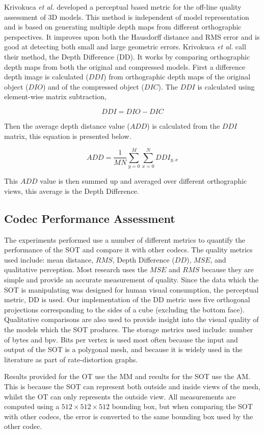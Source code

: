 Krivokuca \textit{et al.} \cite{Krivokuca12New} developed a perceptual based metric for the off-line quality assessment of 3D models. This method is independent of model representation and is based on generating multiple depth maps from different orthographic perspectives. It improves upon both the Hausdorff distance and RMS error and is good at detecting both small and large geometric errors. Krivokuca \textit{et al.} call their method, the Depth Difference (DD). It works by comparing orthographic depth maps from both the original and compressed models. First a difference depth image is calculated ($DDI$) from orthographic depth maps of the original object ($DIO$) and of the compressed object ($DIC$). The $DDI$ is calculated using element-wise matrix subtraction,

$$
DDI = DIO - DIC
$$

Then the average depth distance value ($ADD$) is calculated from the $DDI$ matrix, this equation is presented below.

$$
ADD = \frac{1}{MN} \sum_{y=0}^{M} \sum_{x=0}^{N} DDI_{y,x}
$$

This $ADD$ value is then summed up and averaged over different orthographic views, this average is the Depth Difference.

\subsection{Codec Performance Assessment}

The experiments performed use a number of different metrics to quantify the performance of the SOT and compare it with other codecs. The quality metrics used include: mean distance, $RMS$, Depth Difference ($DD$), $MSE$, and qualitative perception. Most research uses the $MSE$ and $RMS$ because they are simple and provide an accurate measurement of quality. Since the data which the SOT is manipulating was designed for human visual consumption, the perceptual metric, DD is used. Our implementation of the DD metric uses five orthogonal projections corresponding to the sides of a cube (excluding the bottom face). Qualitative comparisons are also used to provide insight into the visual quality of the models which the SOT produces. The storage metrics used include: number of bytes and bpv. Bits per vertex is used most often because the input and output of the SOT is a polygonal mesh, and because it is widely used in the literature as part of rate-distortion graphs.

Results provided for the OT use the MM and results for the SOT use the AM. This is because the SOT can represent both outside and inside views of the mesh, whilst the OT can only represents the outside view. All measurements are computed using a $512 \times 512 \times 512$ bounding box, but when comparing the SOT with other codecs, the error is converted to the same bounding box used by the other codec.

